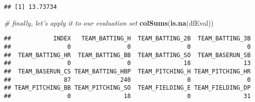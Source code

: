 \documentclass[
]{article}
\newenvironment{Shaded}{\begin{snugshade}}{\end{snugshade}}
\newcommand{\CommentTok}[1]{\textcolor[rgb]{0.56,0.35,0.01}{\textit{#1}}}
\newcommand{\DataTypeTok}[1]{\textcolor[rgb]{0.13,0.29,0.53}{#1}}
\newcommand{\DecValTok}[1]{\textcolor[rgb]{0.00,0.00,0.81}{#1}}
\newcommand{\KeywordTok}[1]{\textcolor[rgb]{0.13,0.29,0.53}{\textbf{#1}}}
\newcommand{\NormalTok}[1]{#1}
\newcommand{\OperatorTok}[1]{\textcolor[rgb]{0.81,0.36,0.00}{\textbf{#1}}}
\newcommand{\StringTok}[1]{\textcolor[rgb]{0.31,0.60,0.02}{#1}}
\begin{document}
\begin{verbatim}
## [1] 13.73734
\end{verbatim}

\begin{Shaded}
\begin{Highlighting}[]
\CommentTok{# finally, let's apply it to our evaluation set}
\KeywordTok{colSums}\NormalTok{(}\KeywordTok{is.na}\NormalTok{(dfEval))}
\end{Highlighting}
\end{Shaded}

\begin{verbatim}
##            INDEX   TEAM_BATTING_H  TEAM_BATTING_2B  TEAM_BATTING_3B 
##                0                0                0                0 
##  TEAM_BATTING_HR  TEAM_BATTING_BB  TEAM_BATTING_SO  TEAM_BASERUN_SB 
##                0                0               18               13 
##  TEAM_BASERUN_CS TEAM_BATTING_HBP  TEAM_PITCHING_H TEAM_PITCHING_HR 
##               87              240                0                0 
## TEAM_PITCHING_BB TEAM_PITCHING_SO  TEAM_FIELDING_E TEAM_FIELDING_DP 
##                0               18                0               31
\end{verbatim}

\begin{Shaded}
\end{Shaded}
\end{document}

